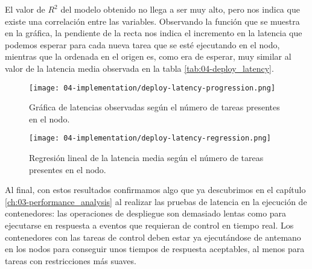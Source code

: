 El valor de $R^{2}$ del modelo obtenido no llega a ser muy alto, pero nos indica
que existe una correlación entre las variables. Observando la función que se
muestra en la gráfica, la pendiente de la recta nos indica el incremento en la
latencia que podemos esperar para cada nueva tarea que se esté ejecutando en el
nodo, mientras que la ordenada en el origen es, como era de esperar, muy similar
al valor de la latencia media observada en la tabla \ref{tab:04-deploy_latency}.

\begin{figure}
    \centering
    \texttt{[image: 04-implementation/deploy-latency-progression.png]}
    \caption{Gráfica de latencias observadas según el número de tareas presentes
        en el nodo.}
    \label{fig:04-deploy_latency_progression}
\end{figure}

\begin{figure}
    \centering
    \texttt{[image: 04-implementation/deploy-latency-regression.png]}
    \caption{Regresión lineal de la latencia media según el número de tareas
        presentes en el nodo.}
    \label{fig:04-deploy_latency_regression}
\end{figure}

Al final, con estos resultados confirmamos algo que ya descubrimos en el
capítulo \ref{ch:03-performance_analysis} al realizar las pruebas de latencia en
la ejecución de contenedores: las operaciones de despliegue son demasiado lentas
como para ejecutarse en respuesta a eventos que requieran de control en tiempo
real. Los contenedores con las tareas de control deben estar ya ejecutándose de
antemano en los nodos para conseguir unos tiempos de respuesta aceptables, al
menos para tareas con restricciones más suaves.